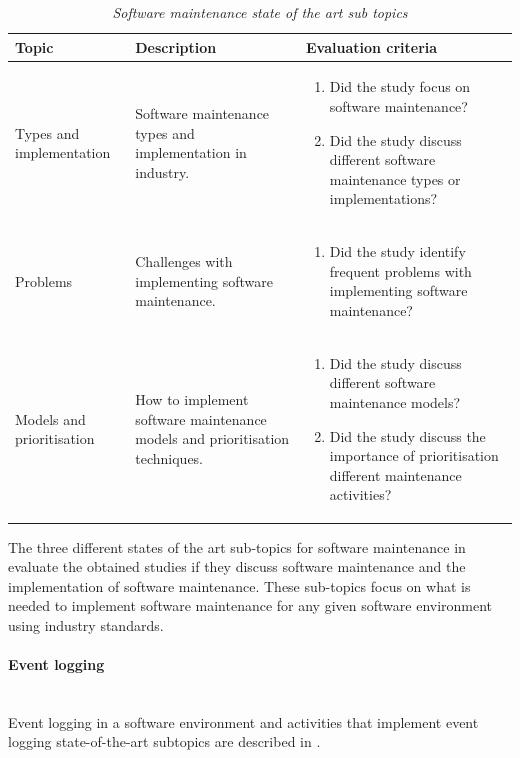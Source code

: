 \begin{table}[!htb]
	\centering
	\caption[Software maintenance state of the art sub topics]
	{\textit{Software maintenance state of the art sub topics}}
	\label{tbl:ch1_soaSoftwareMaintennace}
	\begin{tabularx}{\linewidth}{|l|X|X|}
		\hline \textbf{Topic}  & \textbf{Description} & \textbf{Evaluation criteria}\\
		\hline Types and implementation & \RaggedRight Software maintenance types and implementation in industry. & \RaggedRight \begin{enumerate}
			\item Did the study focus on software maintenance?
			\item Did the study discuss different software maintenance types or implementations?
		\end{enumerate} \\
		\hline Problems & Challenges with implementing software maintenance. & \RaggedRight \begin{enumerate}
			\item Did the study identify frequent problems with implementing software maintenance?
		\end{enumerate}\\
		\hline Models and prioritisation & How to implement software maintenance models and prioritisation techniques. & \RaggedRight \begin{enumerate}
			\item Did the study discuss different software maintenance models?
			\item Did the study discuss the importance of prioritisation different maintenance activities?
		\end{enumerate} \\
		\hline
	\end{tabularx}
\end{table}

\clearpage

The three different states of the art sub-topics for software maintenance in  evaluate the obtained studies if they discuss software maintenance and the implementation of software maintenance. These sub-topics focus on what is needed to implement software maintenance for any given software environment using industry standards.

\paragraph{Event logging} \leavevmode\\
Event logging in a software environment and activities that implement event logging state-of-the-art subtopics are described in .

